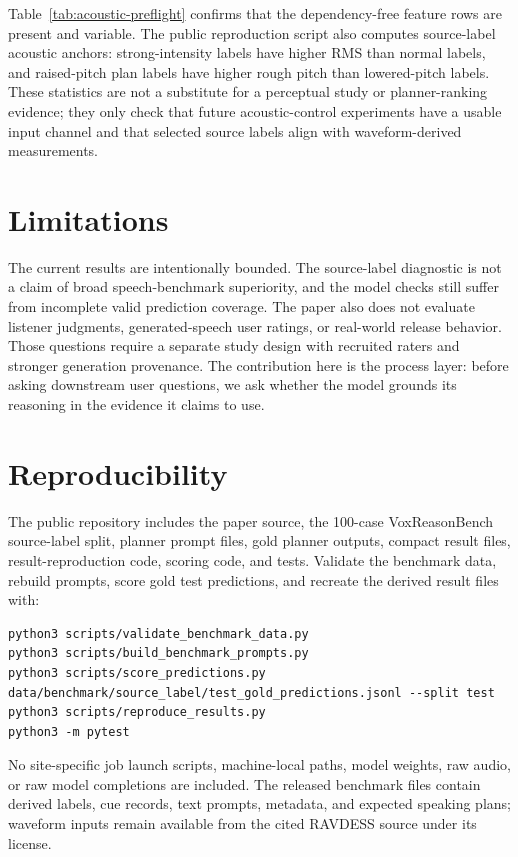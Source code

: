 \documentclass{article}
\begin{document}
Table~\ref{tab:acoustic-preflight} confirms that the dependency-free feature rows are present and variable. The public reproduction script also computes source-label acoustic anchors: strong-intensity labels have higher RMS than normal labels, and raised-pitch plan labels have higher rough pitch than lowered-pitch labels. These statistics are not a substitute for a perceptual study or planner-ranking evidence; they only check that future acoustic-control experiments have a usable input channel and that selected source labels align with waveform-derived measurements.

\section{Limitations}
The current results are intentionally bounded. The source-label diagnostic is not a claim of broad speech-benchmark superiority, and the model checks still suffer from incomplete valid prediction coverage. The paper also does not evaluate listener judgments, generated-speech user ratings, or real-world release behavior. Those questions require a separate study design with recruited raters and stronger generation provenance. The contribution here is the process layer: before asking downstream user questions, we ask whether the model grounds its reasoning in the evidence it claims to use.

\section{Reproducibility}
The public repository includes the paper source, the 100-case VoxReasonBench source-label split, planner prompt files, gold planner outputs, compact result files, result-reproduction code, scoring code, and tests. Validate the benchmark data, rebuild prompts, score gold test predictions, and recreate the derived result files with:
\begin{verbatim}
python3 scripts/validate_benchmark_data.py
python3 scripts/build_benchmark_prompts.py
python3 scripts/score_predictions.py data/benchmark/source_label/test_gold_predictions.jsonl --split test
python3 scripts/reproduce_results.py
python3 -m pytest
\end{verbatim}
No site-specific job launch scripts, machine-local paths, model weights, raw audio, or raw model completions are included. The released benchmark files contain derived labels, cue records, text prompts, metadata, and expected speaking plans; waveform inputs remain available from the cited RAVDESS source under its license.



\end{document}
